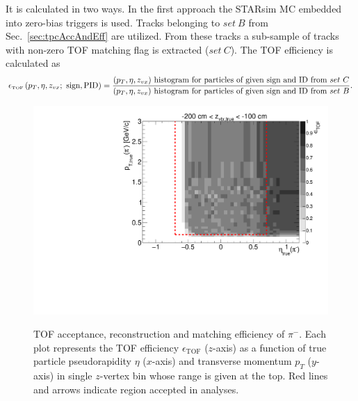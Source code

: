 It is calculated in two ways. In the first approach the STARsim MC embedded into zero-bias triggers is used. Tracks belonging to $set~B$ from Sec.~\ref{sec:tpcAccAndEff} are utilized. From these tracks a sub-sample of tracks with non-zero TOF matching flag is extracted ($set~C$). The TOF efficiency is calculated as
\begin{equation}\label{eq:tofAccAndEffDefinition}
		\epsilon_{\textrm{\tiny TOF}}\left(p_{T}, \eta, z_{vx};~\textrm{sign},\textrm{PID}\right) = \frac{(p_{T},\eta, z_{vx})~\textrm{histogram for particles of given sign and ID from}~set~C}{(p_{T},\eta, z_{vx})~\textrm{histogram for particles of given sign and ID from}~set~B}.
	\end{equation}



\begin{figure}[hb]
\caption[TOF acceptance, reconstruction and matching efficiency of $\pi^{-}$.]{TOF acceptance, reconstruction and matching efficiency of $\pi^{-}$. Each plot represents the TOF efficiency $\epsilon_{\text{TOF}}$ ($z$-axis) as a function of true particle pseudorapidity $\eta$ ($x$-axis) and transverse momentum $p_{T}$ ($y$-axis) in single $z$-vertex bin whose range is given at the top. Red lines and arrows indicate region accepted in analyses.}\label{fig:eff_pion_minus}
\centering
\parbox{0.495\textwidth}{
  \centering
  \includegraphics[width=\linewidth,page=3]{graphics/eff/Eff2D_TOF_pion_Minus.pdf}\\
}
\end{figure}
